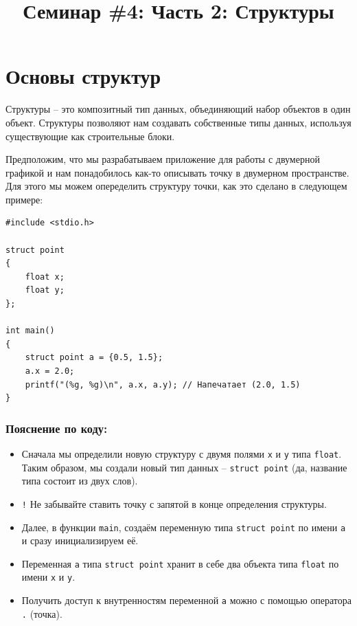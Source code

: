 \documentclass[10pt]{article}
\begin{document}
\title{Семинар \#4: Часть 2: Структуры\vspace{-5ex}}\date{}\maketitle

\section*{Основы структур}

Структуры -- это композитный тип данных, объединяющий набор объектов в один объект. Структуры позволяют нам создавать собственные типы данных, используя существующие как строительные блоки.

Предположим, что мы разрабатываем приложение для работы с двумерной графикой и нам понадобилось как-то описывать точку в двумерном пространстве. Для этого  мы можем опеределить структуру точки, как это сделано в следующем примере:
\begin{lstlisting}
#include <stdio.h>

struct point 
{
    float x;
    float y;
};

int main() 
{
    struct point a = {0.5, 1.5};
    a.x = 2.0;
    printf("(%g, %g)\n", a.x, a.y); // Напечатает (2.0, 1.5)
}
\end{lstlisting}
\subsubsection*{Пояснение по коду:}
\begin{itemize}
\item Сначала мы определили новую структуру с двумя полями \texttt{x} и \texttt{y} типа \texttt{float}. Таким образом, мы создали новый тип данных -- \texttt{struct point} (да, название типа состоит из двух слов).
\item \texttt{!} Не забывайте ставить точку с запятой в конце определения структуры.
\item Далее, в функции \texttt{main}, создаём переменную типа \texttt{struct point} по имени \texttt{a} и сразу инициализируем её.
\item Переменная \texttt{a} типа \texttt{struct point} хранит в себе два объекта типа \texttt{float} по имени \texttt{x} и \texttt{y}.
\item Получить доступ к внутренностям переменной \texttt{a} можно с помощью оператора \texttt{.} (точка).
\end{itemize}
\end{document}
